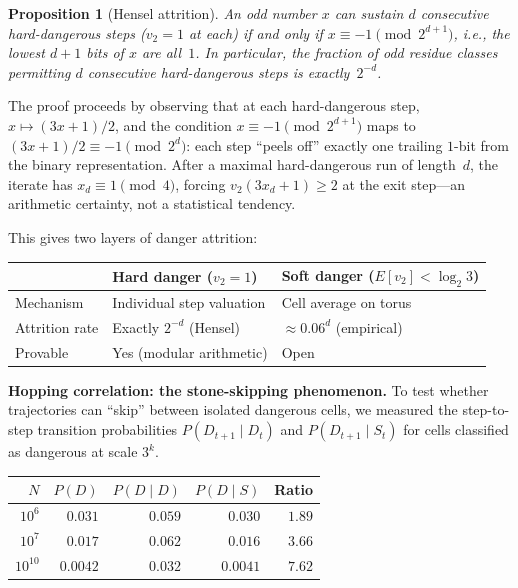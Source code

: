 \documentclass[manuscript]{aomart}
\theoremstyle{plain}
\newtheorem{proposition}[theorem]{Proposition}
\theoremstyle{definition}
\theoremstyle{remark}
\numberwithin{equation}{section}
\begin{document}
\begin{proposition}[Hensel attrition]\label{prop:hensel-attrition}
An odd number $x$ can sustain $d$ consecutive hard-dangerous
steps ($v_2 = 1$ at each) if and only if
$x \equiv -1 \pmod{2^{d+1}}$, i.e., the lowest $d+1$ bits of $x$
are all~$1$.  In particular, the fraction of odd residue classes
permitting $d$ consecutive hard-dangerous steps is exactly~$2^{-d}$.
\end{proposition}

\noindent
The proof proceeds by observing that at each hard-dangerous step,
$x \mapsto (3x+1)/2$, and the condition $x \equiv -1 \pmod{2^{d+1}}$
maps to $(3x+1)/2 \equiv -1 \pmod{2^d}$: each step ``peels off''
exactly one trailing $1$-bit from the binary representation.  After
a maximal hard-dangerous run of length~$d$, the iterate has
$x_d \equiv 1 \pmod{4}$, forcing $v_2(3x_d + 1) \ge 2$ at the
exit step---an arithmetic certainty, not a statistical tendency.

This gives two layers of danger attrition:
\begin{center}
\renewcommand{\arraystretch}{1.3}
\begin{tabular}{lll}
  \toprule
  & \textbf{Hard danger} ($v_2 = 1$) & \textbf{Soft danger} ($E[v_2] < \log_2 3$) \\
  \midrule
  Mechanism & Individual step valuation & Cell average on torus \\
  Attrition rate & Exactly $2^{-d}$ (Hensel) & $\approx 0.06^d$ (empirical) \\
  Provable & Yes (modular arithmetic) & Open \\
  \bottomrule
\end{tabular}
\end{center}

\medskip\noindent
\textbf{Hopping correlation: the stone-skipping phenomenon.}\enspace
To test whether trajectories can ``skip'' between isolated dangerous
cells, we measured the step-to-step transition probabilities
$P(D_{t+1} \mid D_t)$ and $P(D_{t+1} \mid S_t)$ for cells classified
as dangerous at scale $3^k$.

\begin{center}
\renewcommand{\arraystretch}{1.3}
\begin{tabular}{rrrrr}
  \toprule
  $N$ & $P(D)$ & $P(D \mid D)$ & $P(D \mid S)$ & Ratio \\
  \midrule
  $10^6$ & $0.031$ & $0.059$ & $0.030$ & $1.89$ \\
  $10^7$ & $0.017$ & $0.062$ & $0.016$ & $3.66$ \\
  $10^{10}$ & $0.0042$ & $0.032$ & $0.0041$ & $7.62$ \\
  \bottomrule
\end{tabular}
\end{center}
\end{document}
